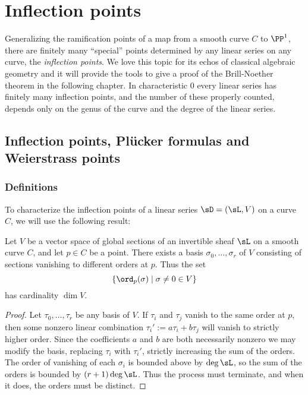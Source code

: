 

\chapter{Inflection points}\label{inflections chapter}
\label{InflectionsChapter}


Generalizing the ramification points of a map from a smooth curve $C$ to $\PP^1$, there are finitely
many ``special'' points determined by any linear series on any curve, the \emph{inflection points}.
We love this topic for its echos of classical algebraic geometry and it will provide the tools to give a proof of the Brill-Noether theorem in the following chapter. In characteristic 0 every linear series has finitely many inflection points, and the number of these properly counted, depends only on the genus of the curve and the degree of the linear series.

\section{Inflection points,  Pl\"ucker formulas and Weierstrass points}

\subsection{Definitions}
To characterize the inflection points of a linear series $\sD = (\sL, V)$ on a curve $C$, we will use the following result:

\begin{proposition}\label{vanishing sequence} Let $V$ be a vector space of global sections of an invertible sheaf $\sL$ on a smooth curve $C$, and let $p \in C$ be a point. There exists a basis $\sigma_0, \dots, \sigma_r$ of $V$ consisting of sections vanishing to different orders at $p$. Thus the set
$$
\{ \ord_p(\sigma) \mid \sigma \neq 0 \in V \}
$$
 has cardinality $\dim V$.
\end{proposition}

\begin{proof} Let $\tau_0, \dots, \tau_r$ be any basis of $V$.  If  $\tau_i$ and $\tau_j$ vanish to the same order at $p$, then 
some nonzero linear combination $\tau_i' := a\tau_i+b\tau_j$  will vanish to strictly higher order. Since the coefficients $a$ and $b$ are both necessarily nonzero we may modify the basis, replacing $\tau_i$ with $\tau_i'$, strictly increasing the sum of the orders. 
The order of vanishing of each $\sigma_i$ is bounded above by $\deg \sL$, so the sum of the orders is bounded by $(r+1)\deg \sL$. Thus the process must terminate, and when it does,
 the orders must be distinct. \end{proof}

